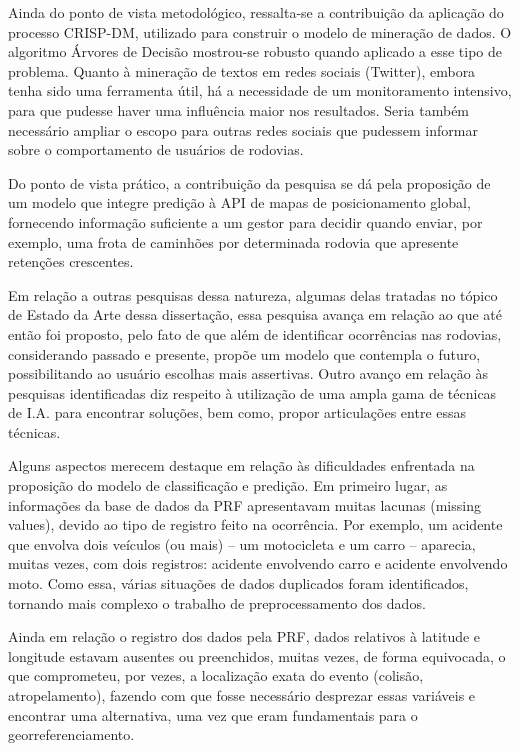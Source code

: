 Ainda do ponto de vista metodológico, ressalta-se a contribuição da aplicação do processo CRISP-DM,
utilizado para construir o modelo de mineração de dados. 
O algoritmo Árvores de Decisão mostrou-se robusto quando aplicado a esse tipo de problema.
Quanto à mineração de textos em redes sociais (Twitter), embora tenha sido uma ferramenta útil, há a necessidade de um monitoramento intensivo, para que pudesse haver uma influência maior nos resultados. Seria também necessário ampliar o escopo para outras redes sociais que pudessem informar sobre o comportamento de usuários de rodovias.

Do ponto de vista prático, a contribuição da pesquisa se dá pela proposição de um modelo que integre predição à
API de mapas de posicionamento global, fornecendo informação suficiente a um gestor para decidir quando enviar,
por exemplo, uma frota de caminhões por determinada rodovia que apresente retenções crescentes.

Em relação a outras pesquisas dessa natureza, algumas delas tratadas no tópico de Estado da Arte dessa dissertação, essa pesquisa avança em relação ao que até então foi proposto, pelo fato de que além de identificar ocorrências nas rodovias, considerando passado e presente, propõe um modelo que contempla o futuro, possibilitando ao usuário escolhas mais assertivas. Outro avanço em relação às pesquisas identificadas diz respeito à utilização de uma ampla gama de técnicas de I.A. para encontrar soluções, bem como, propor articulações entre essas técnicas. 

Alguns aspectos merecem destaque em relação às dificuldades enfrentada na proposição do modelo de classificação e predição. Em primeiro lugar, as informações da base de dados da PRF apresentavam muitas lacunas (missing values), devido ao tipo de registro feito na ocorrência. Por exemplo, um acidente que envolva dois veículos (ou mais) -- um motocicleta e um carro -- aparecia, muitas vezes, com dois registros: acidente envolvendo carro e acidente envolvendo moto. Como essa, várias situações de dados duplicados foram identificados, tornando mais complexo o trabalho de preprocessamento dos dados.

Ainda em relação o registro dos dados pela PRF, dados relativos à latitude e longitude estavam ausentes ou preenchidos, muitas vezes, de forma equivocada, o que comprometeu, por vezes, a localização exata do evento (colisão, atropelamento), fazendo com que fosse necessário desprezar essas variáveis e encontrar uma alternativa, uma vez que eram fundamentais para o georreferenciamento.

